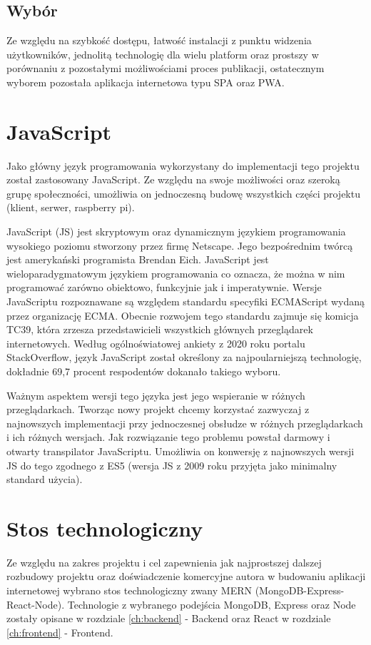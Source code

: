 \subsection{Wybór}
Ze względu na szybkość dostępu, łatwość instalacji z punktu widzenia użytkowników, jednolitą technologię dla wielu platform oraz prostszy w porównaniu z pozostałymi możliwościami proces publikacji, ostatecznym wyborem pozostała aplikacja internetowa typu SPA oraz PWA.

\section{JavaScript}
Jako główny język programowania wykorzystany do implementacji tego projektu został zastosowany JavaScript. Ze względu na swoje możliwości oraz szeroką grupę społeczności, umożliwia on jednoczesną budowę wszystkich części projektu (klient, serwer, raspberry pi).

JavaScript (JS) jest skryptowym oraz dynamicznym językiem programowania wysokiego poziomu stworzony przez firmę Netscape. Jego bezpośrednim twórcą jest amerykański programista Brendan Eich. JavaScript jest wieloparadygmatowym językiem programowania co oznacza, że można w nim programować zarówno obiektowo, funkcyjnie jak i imperatywnie. Wersje JavaScriptu rozpoznawane są względem standardu specyfiki ECMAScript wydaną przez organizację ECMA. Obecnie rozwojem tego standardu zajmuje się komicja TC39, która zrzesza przedstawicieli wszystkich głównych przeglądarek internetowych. \cite{JavaScriptBasics} Według ogólnoświatowej ankiety z 2020 roku portalu StackOverflow, język JavaScript został określony za najpoularniejszą technologię, dokładnie 69,7 procent respodentów dokanało takiego wyboru. \cite{StackOverflowSurvey}

Ważnym aspektem wersji tego języka jest jego wspieranie w różnych przeglądarkach. Tworząc nowy projekt chcemy korzystać zazwyczaj z najnowszych implementacji przy jednoczesnej obsłudze w różnych przeglądarkach i ich różnych wersjach. Jak rozwiązanie tego problemu powstał darmowy i otwarty transpilator JavaScriptu. Umożliwia on konwersję z najnowszych wersji JS do tego zgodnego z ES5 (wersja JS z 2009 roku przyjęta jako minimalny standard użycia).

\section{Stos technologiczny}
Ze względu na zakres projektu i cel zapewnienia jak najprostszej dalszej rozbudowy projektu oraz doświadczenie komercyjne autora w budowaniu aplikacji internetowej wybrano stos technologiczny zwany MERN (MongoDB-Express-React-Node). Technologie z wybranego podejścia MongoDB, Express oraz Node zostały opisane w rozdziale \ref{ch:backend} - Backend oraz React w rozdziale \ref{ch:frontend} - Frontend.

